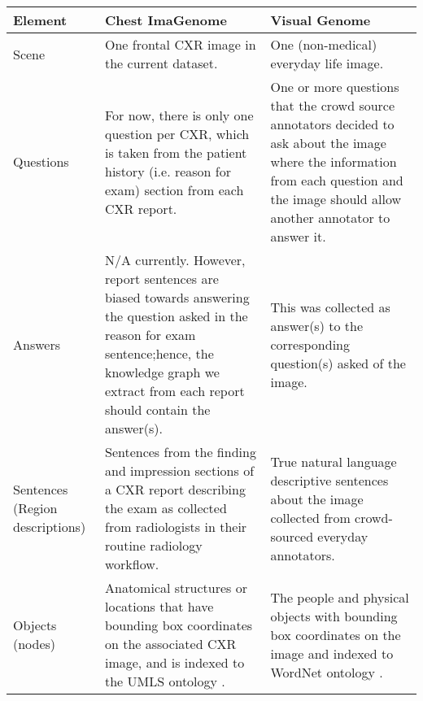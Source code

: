 
\begin{table}[h!]
  \centering
  \footnotesize{
    \begin{tabular}{|p{4em}|p{21em}|p{16em}|}
    \toprule
    \textbf{Element} & \textbf{Chest ImaGenome} & \textbf{Visual Genome} \\
    \midrule
    \midrule
    Scene & One frontal CXR image in the current dataset. & One (non-medical) everyday life image. \\
    \midrule
    Questions & For now, there is only one question per CXR, which is taken from the patient history (i.e. reason for exam) section from each CXR report. & One or more questions that the crowd source annotators decided to ask about the image where the information from each question and the image should allow another annotator to answer it. \\
    \midrule
    Answers & N/A currently. However, report sentences are biased towards answering the question asked in the reason for exam sentence;hence, the knowledge graph we extract from each report should contain the answer(s). & This was collected as answer(s) to the corresponding question(s) asked of the image. \\
    \midrule
    Sentences (Region descriptions) & Sentences from the finding and impression sections of a CXR report describing the exam as collected from radiologists in their routine radiology workflow. & True natural language descriptive sentences about the image collected from crowd-sourced everyday annotators. \\
    \midrule
    Objects (nodes) & Anatomical structures or locations that have bounding box coordinates on the associated CXR image, and is indexed to the UMLS ontology \cite{bodenreider2004unified}. & The people and physical objects with bounding box coordinates on the image and indexed to WordNet ontology \cite{miller1995wordnet}. \\

\end{tabular}}
\end{table}
